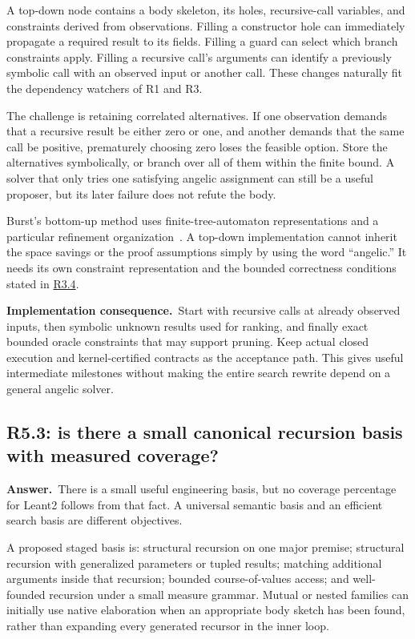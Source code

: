 \documentclass[11pt,a4paper]{article}
\theoremstyle{definition}
\theoremstyle{remark}
\newcommand{\ans}{\noindent\textbf{Answer.}\ }
\newcommand{\imp}{\par\noindent\textbf{Implementation consequence.}\ }
\newcommand{\qref}[1]{\hyperref[q:#1]{#1}}
\begin{document}
A top-down node contains a body skeleton, its holes, recursive-call variables,
and constraints derived from observations. Filling a constructor hole can
immediately propagate a required result to its fields. Filling a guard can
select which branch constraints apply. Filling a recursive call's arguments
can identify a previously symbolic call with an observed input or another
call. These changes naturally fit the dependency watchers of R1 and R3.

The challenge is retaining correlated alternatives. If one observation demands
that a recursive result be either zero or one, and another demands that the
same call be positive, prematurely choosing zero loses the feasible option.
Store the alternatives symbolically, or branch over all of them within the
finite bound. A solver that only tries one satisfying angelic assignment can
still be a useful proposer, but its later failure does not refute the body.

Burst's bottom-up method uses finite-tree-automaton representations and a
particular refinement organization~\cite{burst}. A top-down implementation
cannot inherit the space savings or the proof assumptions simply by using the
word ``angelic.'' It needs its own constraint representation and the bounded
correctness conditions stated in \qref{R3.4}.

\imp Start with recursive calls at already observed inputs, then symbolic
unknown results used for ranking, and finally exact bounded oracle constraints
that may support pruning. Keep actual closed execution and kernel-certified
contracts as the acceptance path. This gives useful intermediate milestones
without making the entire search rewrite depend on a general angelic solver.

\subsection{R5.3: is there a small canonical recursion basis with measured coverage?}\label{q:R5.3}
\ans There is a small useful engineering basis, but no coverage percentage for
Leant2 follows from that fact. A universal semantic basis and an efficient
search basis are different objectives.

A proposed staged basis is: structural recursion on one major premise;
structural recursion with generalized parameters or tupled results; matching
additional arguments inside that recursion; bounded course-of-values access;
and well-founded recursion under a small measure grammar. Mutual or nested
families can initially use native elaboration when an appropriate body sketch
has been found, rather than expanding every generated recursor in the inner
loop.
\end{document}
